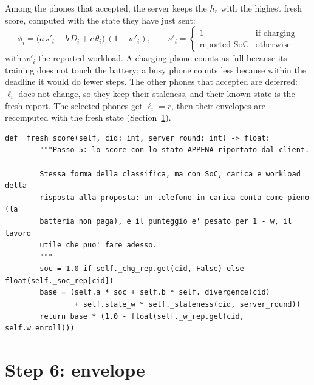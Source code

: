 \documentclass[11pt,a4paper]{article}
\begin{document}
Among the phones that accepted, the server keeps the $h_r$ with the highest
fresh score, computed with the state they have just sent:
\begin{equation}
  \phi_i = \bigl(a \, s'_i + b \, D_i + c \, \theta_i\bigr) \, (1 - w'_i),
  \qquad s'_i = \begin{cases} 1 & \text{if charging} \\ \text{reported SoC} & \text{otherwise} \end{cases}
\end{equation}
with $w'_i$ the reported workload. A charging phone counts as full because its
training does not touch the battery; a busy phone counts less because within
the deadline it would do fewer steps. The other phones that accepted are
deferred: $\ell_i$ does not change, so they keep their staleness, and their
known state is the fresh report. The selected phones get $\ell_i = r$, then
their envelopes are recomputed with the fresh state (Section~\ref{sec:envelope}).

\begin{lstlisting}[style=py,firstnumber=645,caption={\texttt{tesifl/strategies/sage\_smart.py}, lines 645--656}]
    def _fresh_score(self, cid: int, server_round: int) -> float:
        """Passo 5: lo score con lo stato APPENA riportato dal client.

        Stessa forma della classifica, ma con SoC, carica e workload della
        risposta alla proposta: un telefono in carica conta come pieno (la
        batteria non paga), e il punteggio e' pesato per 1 - w, il lavoro
        utile che puo' fare adesso.
        """
        soc = 1.0 if self._chg_rep.get(cid, False) else float(self._soc_rep[cid])
        base = (self.a * soc + self.b * self._divergence(cid)
                + self.stale_w * self._staleness(cid, server_round))
        return base * (1.0 - float(self._w_rep.get(cid, self.w_enroll)))
\end{lstlisting}

\newpage
\section{Step 6: envelope}
\label{sec:envelope}
\end{document}
